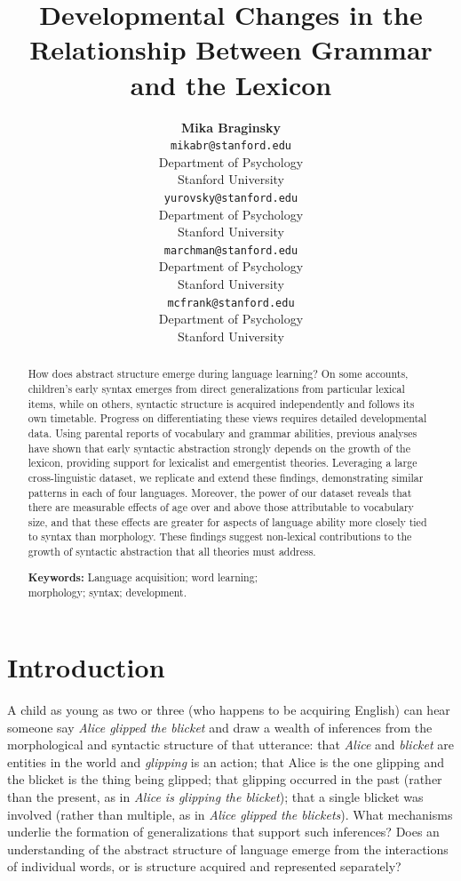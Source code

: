 \documentclass[10pt,letterpaper]{article}
\title{Developmental Changes in the Relationship Between Grammar and the Lexicon}
\author{{\large \bf Mika Braginsky} \\
  \texttt{mikabr@stanford.edu} \\
  Department of Psychology \\
  Stanford University
  \And {\large \bf Daniel Yurovsky} \\
  \texttt{yurovsky@stanford.edu} \\
  Department of Psychology \\
  Stanford University
    \And {\large \bf Virginia A. Marchman} \\
    \texttt{marchman@stanford.edu} \\
  Department of Psychology \\
  Stanford University
    \And {\large \bf Michael C. Frank}\\
    \texttt{mcfrank@stanford.edu} \\
  Department of Psychology \\
  Stanford University}
\begin{document}
\maketitle

\begin{abstract}

How does abstract structure emerge during language learning? On some accounts, children's early syntax emerges from direct generalizations from particular lexical items, while on others, syntactic structure is acquired independently and follows its own timetable. Progress on differentiating these views requires detailed developmental data. Using parental reports of vocabulary and grammar abilities, previous analyses have shown that early syntactic abstraction strongly depends on the growth of the lexicon, providing support for lexicalist and emergentist theories. Leveraging a large cross-linguistic dataset, we replicate and extend these findings, demonstrating similar patterns in each of four languages. Moreover, the power of our dataset reveals that there are measurable effects of age over and above those attributable to vocabulary size, and that these effects are greater for aspects of language ability more closely tied to syntax than morphology. These findings suggest non-lexical contributions to the growth of syntactic abstraction that all theories must address.

\textbf{Keywords:} 
Language acquisition; word learning; \\morphology; syntax; development.
\end{abstract}

\section{Introduction}

A child as young as two or three (who happens to be acquiring English) can hear someone say \emph{Alice glipped the blicket} and draw a wealth of inferences from the morphological and syntactic structure of that utterance: that \emph{Alice} and \emph{blicket} are entities in the world and \emph{glipping} is an action; that Alice is the one glipping and the blicket is the thing being glipped; that glipping occurred in the past (rather than the present, as in \emph{Alice is glipping the blicket}); that a single blicket was involved (rather than multiple, as in \emph{Alice glipped the blickets}). What mechanisms underlie the formation of generalizations that support such inferences? Does an understanding of the abstract structure of language emerge from the interactions of individual words, or is structure acquired and represented separately?
\end{document}
